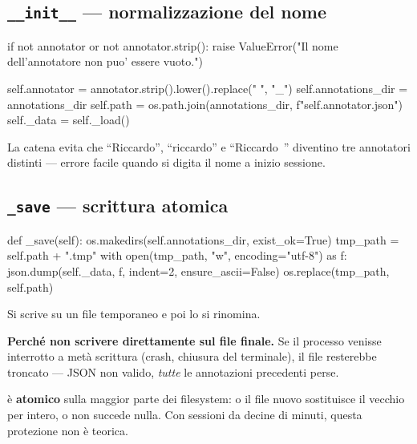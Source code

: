 \subsection{\texttt{\_\_init\_\_} --- normalizzazione del nome}

\begin{idebox}
\begin{pycode}
if not annotator or not annotator.strip():
    raise ValueError("Il nome dell'annotatore non puo' essere vuoto.")

self.annotator = annotator.strip().lower().replace(" ", "_")
self.annotations_dir = annotations_dir
self.path = os.path.join(annotations_dir, f"{self.annotator}.json")
self._data = self._load()
\end{pycode}
\end{idebox}

La catena  evita che ``Riccardo'', ``riccardo'' e
``Riccardo~'' diventino tre annotatori distinti --- errore facile quando si digita il nome a
inizio sessione.

\subsection{\texttt{\_save} --- scrittura atomica}

\begin{idebox}
\begin{pycode}
def _save(self):
    os.makedirs(self.annotations_dir, exist_ok=True)
    tmp_path = self.path + ".tmp"
    with open(tmp_path, "w", encoding="utf-8") as f:
        json.dump(self._data, f, indent=2, ensure_ascii=False)
    os.replace(tmp_path, self.path)
\end{pycode}
\end{idebox}

Si scrive su un file temporaneo e poi lo si rinomina.

\begin{attenzione}
\textbf{Perché non scrivere direttamente sul file finale.} Se il processo venisse interrotto a
metà scrittura (crash, chiusura del terminale), il file resterebbe troncato --- JSON non valido,
\emph{tutte} le annotazioni precedenti perse.

\medskip
{} è \textbf{atomico} sulla maggior parte dei filesystem: o il file nuovo
sostituisce il vecchio per intero, o non succede nulla. Con sessioni da decine di minuti, questa
protezione non è teorica.
\end{attenzione}

